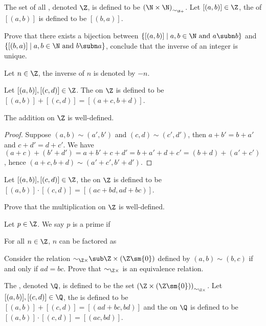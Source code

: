 \documentclass[10pt]{article}
\begin{document}
\begin{definition}
    The set of all , denoted $\Z$, is defined to be ${(\N\times{\N})}_{{\sim}_{\N+}}$. Let $[(a,b)]\in\Z$, the  of $[(a,b)]$ is defined to be $[(b,a)]$.
\end{definition}
\begin{problem}
    Prove that there exists a bijection between $\{[(a,b)]\mid a,b\in\N\ \text{and}\ a\subn b\}$ and $\{[(b,a)]\mid a,b\in\N\ \text{and}\ b\subn a\}$, conclude that the inverse of an integer is unique.
\end{problem}
\par
Let $n\in\Z$, the inverse of $n$ is denoted by $-n$.
\begin{definition}
    Let $[(a,b)],[(c,d)]\in\Z$. The  on $\Z$ is defined to be $[(a,b)]+[(c,d)]=[(a+c,b+d)]$.
\end{definition}
\begin{proposition}
    The addition on $\Z$ is well-defined.
\end{proposition}
\begin{proof}
    Suppose $(a,b)\sim(a',b')$ and $(c,d)\sim(c',d')$, then $a+b'=b+a'$ and $c+d'=d+c'$. We have $(a+c)+(b'+d')=a+b'+c+d'=b+a'+d+c'=(b+d)+(a'+c')$, hence $(a+c,b+d)\sim(a'+c',b'+d')$.
\end{proof}
\begin{definition}
    Let $[(a,b)],[(c,d)]\in\Z$, the  on $\Z$ is defined to be $[(a,b)]\cdot[(c,d)]=[(ac+bd,ad+bc)]$.
\end{definition}
\begin{problem}
    Prove that the multiplication on $\Z$ is well-defined.
\end{problem}
\begin{definition}
    Let $p\in\Z$. We say $p$ is a prime if 
\end{definition}
\begin{theorem}
    For all $n\in\Z$, $n$ can be factored as 
\end{theorem}
\begin{problem}
    Consider the relation ${\sim}_{\Z\times}\sub\Z\times(\Z\sm\{0\})$ defined by $(a,b)\sim(b,c)$ if and only if $ad=bc$. Prove that ${\sim}_{\Z\times}$ is an equivalence relation.
\end{problem}
\begin{definition}
    The , denoted $\Q$, is defined to be the set ${(\Z\times(\Z\sm\{0\}))}_{{\sim}_{\Z\times}}$. Let $[(a,b)],[(c,d)]\in\Q$, the  is defined to be $[(a,b)]+[(c,d)]=[(ad+bc,bd)]$ and the  on $\Q$ is defined to be $[(a,b)]\cdot[(c,d)]=[(ac,bd)]$.
\end{definition}
\end{document}
